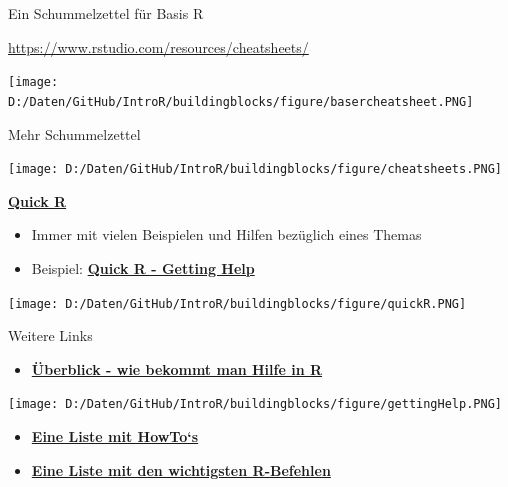 \documentclass[ignorenonframetext,]{beamer}
\providecommand{\tightlist}{%
  \setlength{\itemsep}{0pt}\setlength{\parskip}{0pt}}
\begin{document}
\begin{frame}{Ein Schummelzettel für Basis R}

\url{https://www.rstudio.com/resources/cheatsheets/}

\texttt{[image: D:/Daten/GitHub/IntroR/buildingblocks/figure/basercheatsheet.PNG]}

\end{frame}

\begin{frame}{Mehr Schummelzettel}

\texttt{[image: D:/Daten/GitHub/IntroR/buildingblocks/figure/cheatsheets.PNG]}

\end{frame}

\begin{frame}{\href{http://www.statmethods.net/interface/help.html}{\textbf{Quick
R}}}

\begin{itemize}
\tightlist
\item
  Immer mit vielen Beispielen und Hilfen bezüglich eines Themas
\item
  Beispiel:
  \href{http://www.statmethods.net/interface/help.html}{\textbf{Quick R
  - Getting Help}}
\end{itemize}

\texttt{[image: D:/Daten/GitHub/IntroR/buildingblocks/figure/quickR.PNG]}

\end{frame}

\begin{frame}{Weitere Links}

\begin{itemize}
\tightlist
\item
  \href{https://www.r-project.org/help.html}{\textbf{Überblick - wie
  bekommt man Hilfe in R}}
\end{itemize}

\texttt{[image: D:/Daten/GitHub/IntroR/buildingblocks/figure/gettingHelp.PNG]}

\begin{itemize}
\item
  \href{http://rprogramming.net/}{\textbf{Eine Liste mit HowTo`s}}
\item
  \href{https://www.personality-project.org/r/r.commands.html}{\textbf{Eine
  Liste mit den wichtigsten R-Befehlen}}
\end{itemize}

\end{frame}
\end{document}

